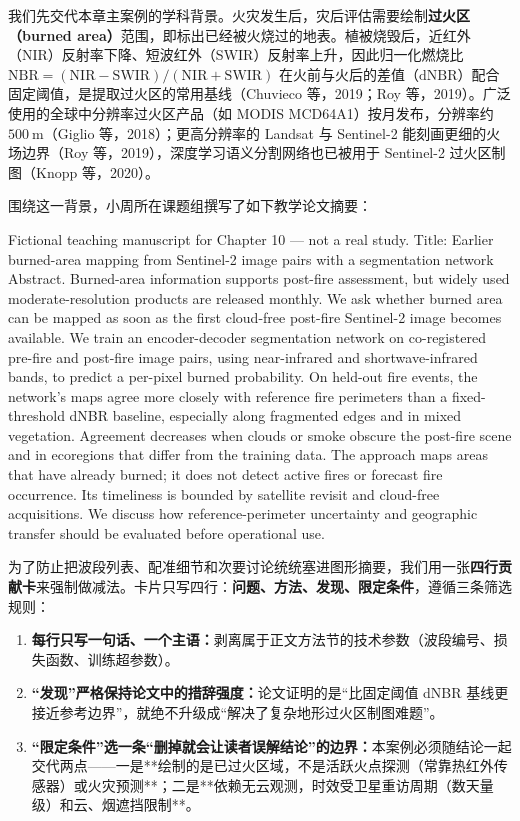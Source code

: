 我们先交代本章主案例的学科背景。火灾发生后，灾后评估需要绘制\textbf{过火区（burned area）}范围，即标出已经被火烧过的地表。植被烧毁后，近红外（NIR）反射率下降、短波红外（SWIR）反射率上升，因此归一化燃烧比 $\text{NBR} = (\text{NIR} - \text{SWIR}) / (\text{NIR} + \text{SWIR})$ 在火前与火后的差值（$\text{dNBR}$）配合固定阈值，是提取过火区的常用基线（Chuvieco 等，2019；Roy 等，2019）。广泛使用的全球中分辨率过火区产品（如 MODIS MCD64A1）按月发布，分辨率约 $500\ \text{m}$（Giglio 等，2018）；更高分辨率的 Landsat 与 Sentinel-2 能刻画更细的火场边界（Roy 等，2019），深度学习语义分割网络也已被用于 Sentinel-2 过火区制图（Knopp 等，2020）。

围绕这一背景，小周所在课题组撰写了如下教学论文摘要：

\begin{Prompt}
Fictional teaching manuscript for Chapter 10 — not a real study.
Title: Earlier burned-area mapping from Sentinel-2 image pairs with a
segmentation network
Abstract. Burned-area information supports post-fire assessment, but widely
used moderate-resolution products are released monthly. We ask whether burned
area can be mapped as soon as the first cloud-free post-fire Sentinel-2 image
becomes available. We train an encoder-decoder segmentation network on
co-registered pre-fire and post-fire image pairs, using near-infrared and
shortwave-infrared bands, to predict a per-pixel burned probability. On
held-out fire events, the network's maps agree more closely with reference fire
perimeters than a fixed-threshold dNBR baseline, especially along fragmented
edges and in mixed vegetation. Agreement decreases when clouds or smoke obscure
the post-fire scene and in ecoregions that differ from the training data. The
approach maps areas that have already burned; it does not detect active fires
or forecast fire occurrence. Its timeliness is bounded by satellite revisit and
cloud-free acquisitions. We discuss how reference-perimeter uncertainty and
geographic transfer should be evaluated before operational use.
\end{Prompt}

为了防止把波段列表、配准细节和次要讨论统统塞进图形摘要，我们用一张\textbf{四行贡献卡}来强制做减法。卡片只写四行：\textbf{问题、方法、发现、限定条件}，遵循三条筛选规则：
\begin{enumerate}
\item \textbf{每行只写一句话、一个主语：}剥离属于正文方法节的技术参数（波段编号、损失函数、训练超参数）。
\item \textbf{“发现”严格保持论文中的措辞强度：}论文证明的是“比固定阈值 dNBR 基线更接近参考边界”，就绝不升级成“解决了复杂地形过火区制图难题”。
\item \textbf{“限定条件”选一条“删掉就会让读者误解结论”的边界：}本案例必须随结论一起交代两点——一是**绘制的是已过火区域，不是活跃火点探测（常靠热红外传感器）或火灾预测**；二是**依赖无云观测，时效受卫星重访周期（数天量级）和云、烟遮挡限制**。
\end{enumerate}

